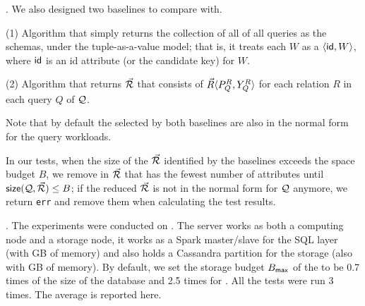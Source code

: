 . We also designed two baselines to compare with.

\sstab (1) Algorithm \qcssel that simply returns the collection
of all \qcs of all queries as the schemas, under the
tuple-as-a-value model; that is, it treats each \qcs $W$ as a \bs
$\langle \protect\mathsf{id},\allowbreak W\rangle$, where $\protect\mathsf{id}$ is an id attribute (or
the candidate key) for $W$.

\sstab (2) Algorithm \uscsel that returns $\vec{{\mathcal R}}$ that consists
of \bss $\vec{R}\langle P_{Q}^{R},\allowbreak Y_{Q}^{R}\rangle$ for each relation $R$
in each query $Q$ of $\mathcal Q$.

\vspace{0.4ex}
Note that by default the \bdss selected by both baselines
are also in the normal form for the query workloads.

In our tests, when the size of the
\bdss $\vec{{\mathcal R}}$ identified by the baselines %
exceeds the space budget $B$, we remove \bss in $\vec{{\mathcal R}}$ that has
the fewest number of attributes until ${\mathsf{size}}(\mathcal Q, \vec{{\mathcal R}})\leq B$;
if the reduced $\vec{{\mathcal R}}$ is not in the normal form for $\mathcal Q$
anymore, we return \texttt{err} and remove them when calculating the
test results.












.
The experiments were conducted on .
The server works as both a computing node and a storage node, \ie it works
as a Spark master/slave for the SQL layer (with \xx GB of memory) and also holds a
Cassandra partition for the storage (also with \xx GB of memory).
By default, we set the storage budget $B_{\protect\mathsf{max}}$ of the
\bdss to be 0.7 times of the size of the \imdb database
and 2.5 times for \tpch.
All the tests were run 3 times. The average is reported here.


